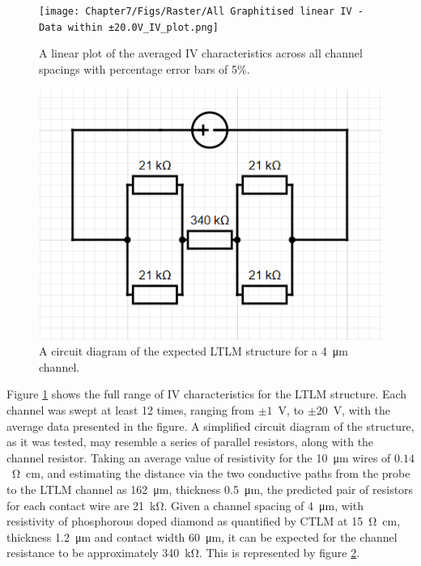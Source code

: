 \begin{refsection}
\begin{figure}[H]
    \centering
    \texttt{[image: Chapter7/Figs/Raster/All Graphitised linear IV - Data within ±20.0V\_IV\_plot.png]}
    \caption{A linear plot of the averaged IV characteristics across all channel spacings with percentage error bars of 5\%.}
    \label{fig:all_linear_iv}
\end{figure}

\begin{figure}
  \centering
  \includegraphics[width=\linewidth]{Chapter7/Figs/Raster/missing_resistance_circuit.png}
  \caption{A circuit diagram of the expected LTLM structure for a 4~\si{\micro\metre} channel.}
  \label{fig:missing_resistance}
\end{figure}

Figure \ref{fig:all_linear_iv} shows the full range of IV characteristics for the LTLM structure. Each channel was swept at least 12 times, ranging from $\pm1$~\si{\volt}, to $\pm20$~\si{\volt}, with the average data presented in the figure. A simplified circuit diagram of the structure, as it was tested, may resemble a series of parallel resistors, along with the channel resistor. Taking an average value of resistivity for the 10~\si{\micro\metre} wires of $0.14$~\si{\ohm\centi\metre}, and estimating the distance via the two conductive paths from the probe to the LTLM channel as 162~\si{\micro\metre}, thickness 0.5~\si{\micro\metre}, the predicted pair of resistors for each contact wire are 21~\si{\kilo\ohm}. Given a channel spacing of 4~\si{\micro\metre}, with resistivity of phosphorous doped diamond as quantified by CTLM at 15~\si{\ohm\centi\metre}, thickness 1.2~\si{\micro\metre} and contact width 60~\si{\micro\metre}, it can be expected for the channel resistance to be approximately 340~\si{\kilo\ohm}. This is represented by figure \ref{fig:missing_resistance}.


\end{refsection}
